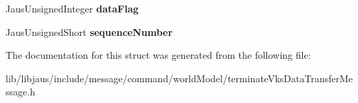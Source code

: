 \begin{DoxyCompactItemize}
\item 
\hypertarget{struct_terminate_vks_data_transfer_message_struct_a6fd3419bdf2bb10c13834f785aaa7984}{\-Jaus\-Unsigned\-Integer {\bfseries data\-Flag}}\label{struct_terminate_vks_data_transfer_message_struct_a6fd3419bdf2bb10c13834f785aaa7984}

\item 
\hypertarget{struct_terminate_vks_data_transfer_message_struct_a4714c1fc3fea588dff36e208ec6dee53}{\-Jaus\-Unsigned\-Short {\bfseries sequence\-Number}}\label{struct_terminate_vks_data_transfer_message_struct_a4714c1fc3fea588dff36e208ec6dee53}

\end{DoxyCompactItemize}


\-The documentation for this struct was generated from the following file\-:\begin{DoxyCompactItemize}
\item 
lib/libjaus/include/message/command/world\-Model/terminate\-Vks\-Data\-Transfer\-Message.\-h\end{DoxyCompactItemize}
